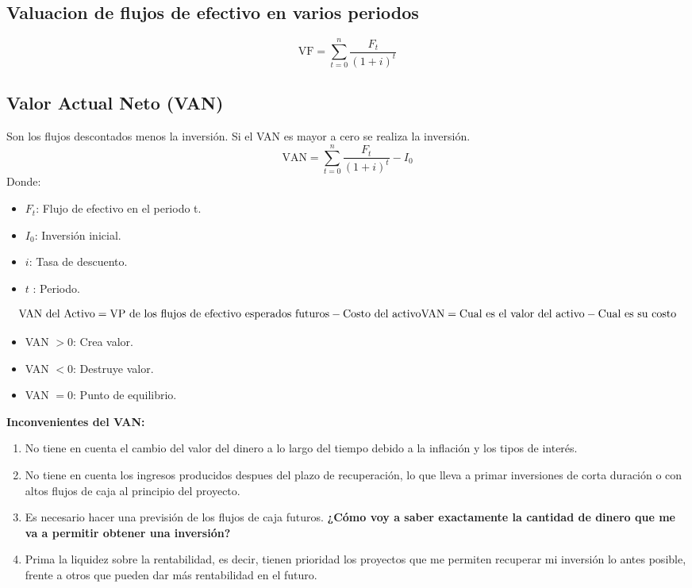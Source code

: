 \documentclass{templateNote}
\begin{document}
\subsection*{Valuacion de flujos de efectivo en varios periodos}
\begin{equation*}
    \text{VF} = \sum_{t=0}^{n} \frac{F_t}{(1 + i)^t}
\end{equation*}

\subsection*{Valor Actual Neto (VAN)}
Son los flujos descontados menos la inversión.
Si el VAN es mayor a cero se realiza la inversión.
\begin{equation*}
    \text{VAN} = \sum_{t=0}^{n} \frac{F_t}{(1 + i)^t} - I_0
\end{equation*}
Donde:
\begin{itemize}
    \item $F_t$: Flujo de efectivo en el periodo t.
    \item $I_0$: Inversión inicial.
    \item $i$: Tasa de descuento.
    \item $t$ : Periodo.
\end{itemize}
\begin{equation*}
    \text{VAN del Activo} = \text{VP de los flujos de efectivo esperados futuros} - \text{Costo del activo}\\
    \text{VAN} = \text{Cual es el valor del activo} - \text{Cual es su costo}
\end{equation*}
\begin{itemize}
    \item VAN $ > 0$: Crea valor.
    \item VAN $ < 0$: Destruye valor.
    \item VAN $ = 0$: Punto de equilibrio.
\end{itemize}
\textbf{Inconvenientes del VAN:}
\begin{enumerate}
    \item No tiene en cuenta el cambio del valor del dinero a lo largo del tiempo debido a la inflación y los tipos de interés.
    \item No tiene en cuenta los ingresos producidos despues del plazo de recuperación, lo que lleva a primar inversiones de corta duración o con altos flujos de caja al principio del proyecto.
    \item Es necesario hacer una previsión de los flujos de caja futuros. \textbf{¿Cómo voy a saber exactamente la cantidad de dinero que me va a permitir obtener una inversión?}
    \item Prima la liquidez sobre la rentabilidad, es decir, tienen prioridad los proyectos que me permiten recuperar mi inversión lo antes posible, frente a otros que pueden dar más rentabilidad en el futuro.
\end{enumerate}
\end{document}
